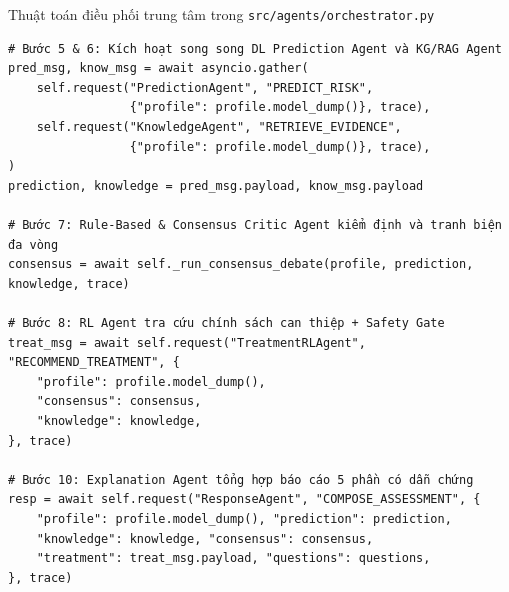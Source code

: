 \begin{code}{Thuật toán điều phối trung tâm trong \texttt{src/agents/orchestrator.py}}
\label{code:orchestrator-core}
\begin{verbatim}
# Bước 5 & 6: Kích hoạt song song DL Prediction Agent và KG/RAG Agent
pred_msg, know_msg = await asyncio.gather(
    self.request("PredictionAgent", "PREDICT_RISK",
                 {"profile": profile.model_dump()}, trace),
    self.request("KnowledgeAgent", "RETRIEVE_EVIDENCE",
                 {"profile": profile.model_dump()}, trace),
)
prediction, knowledge = pred_msg.payload, know_msg.payload

# Bước 7: Rule-Based & Consensus Critic Agent kiểm định và tranh biện đa vòng
consensus = await self._run_consensus_debate(profile, prediction, knowledge, trace)

# Bước 8: RL Agent tra cứu chính sách can thiệp + Safety Gate
treat_msg = await self.request("TreatmentRLAgent", "RECOMMEND_TREATMENT", {
    "profile": profile.model_dump(),
    "consensus": consensus,
    "knowledge": knowledge,
}, trace)

# Bước 10: Explanation Agent tổng hợp báo cáo 5 phần có dẫn chứng
resp = await self.request("ResponseAgent", "COMPOSE_ASSESSMENT", {
    "profile": profile.model_dump(), "prediction": prediction,
    "knowledge": knowledge, "consensus": consensus,
    "treatment": treat_msg.payload, "questions": questions,
}, trace)
\end{verbatim}
\end{code}

